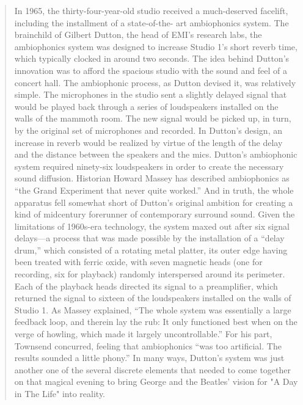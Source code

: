 \begin{quote}

In 1965, the thirty-four-year-old studio
received a much-deserved facelift, including the installment of a state-of-the-
art ambiophonics system. The brainchild of Gilbert Dutton, the head of EMI’s
research labs, the ambiophonics system was designed to increase Studio 1’s
short reverb time, which typically clocked in around two seconds. The idea
behind Dutton’s innovation was to afford the spacious studio with the sound and feel of a concert hall.
The ambiophonic process, as Dutton devised it, was relatively simple. The microphones in the studio sent a slightly delayed signal that would be played back through a series of loudspeakers installed on the walls of the mammoth room. The new signal would be picked up, in turn, by the original set of microphones and recorded. In Dutton’s design, an increase in reverb would be realized by virtue of the length of the delay and the distance between the speakers and the mics. Dutton’s ambiophonic system required ninety-six loudspeakers in order to create the necessary sound diffusion. Historian Howard Massey has described ambiophonics as “the Grand Experiment that never quite worked.” And in truth, the whole apparatus fell somewhat short of Dutton’s original ambition for creating a kind of midcentury forerunner of contemporary surround sound.
Given the limitations of 1960s-era technology, the system maxed out after six signal delays—a
process that was made possible by the installation of a “delay drum,” which
consisted of a rotating metal platter, its outer edge having been treated with
ferric oxide, with seven magnetic heads (one for recording, six for playback)
randomly interspersed around its perimeter. Each of the playback heads
directed its signal to a preamplifier, which returned the signal to sixteen of the
loudspeakers installed on the walls of Studio 1. As Massey explained, “The
whole system was essentially a large feedback loop, and therein lay the rub: It
only functioned best when on the verge of howling, which made it largely
uncontrollable.” For his part, Townsend concurred, feeling that ambiophonics
“was too artificial. The results sounded a little phony.” In many ways,
Dutton’s system was just another one of the several discrete elements that
needed to come together on that magical evening to bring George and the Beatles' vision for "A Day in The Life" into reality.

\end{quote}



